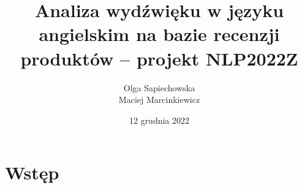 \documentclass{article}
\title{Analiza wydźwięku w języku angielskim na bazie recenzji produktów -- projekt NLP2022Z}
\author{Olga Sapiechowska\\Maciej Marcinkiewicz}
\date{12 grudnia 2022}
\begin{document}
\maketitle

\section{Wstęp}

\end{document}
